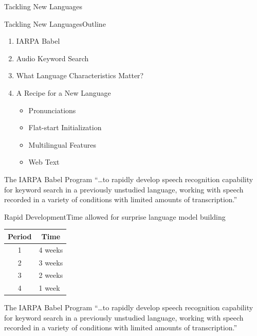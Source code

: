 \begin{frame}
  \begin{center}
    {\color{Maroon}\Huge Tackling New Languages}
  \end{center}
\end{frame}

\begin{frame}{Tackling New Languages}{Outline}
  \begin{enumerate}
  \item IARPA Babel
  \item Audio Keyword Search
  \item What Language Characteristics Matter?
  \item A Recipe for a New Language
    \begin{itemize}
    \item Pronunciations
    \item Flat-start Initialization
    \item Multilingual Features
    \item Web Text
    \end{itemize}
  \end{enumerate}
\end{frame}

\begin{frame}{The IARPA Babel Program}{}
  \Large{``\ldots to \alert{rapidly develop} speech recognition
    capability for keyword search in a previously unstudied
    language, working with speech recorded in a variety of
    conditions with limited amounts of transcription.''}\par
\end{frame}

\begin{frame}{Rapid Development}{Time allowed for surprise language model building}
  \centering
  \begin{tabular}{@{}cl@{}} \toprule
    {\bf Period} & \multicolumn{1}{c}{\bf Time} \\ \midrule
    1 & 4 weeks \\
    2 & 3 weeks \\
    3 & 2 weeks \\
    4 & 1 week  \\ \bottomrule
  \end{tabular}
\end{frame}

\begin{frame}{The IARPA Babel Program}{}
  \Large{``\ldots to rapidly develop speech recognition
    capability for keyword search in a \alert{previously unstudied
      language}, working with speech recorded in a variety of
    conditions with limited amounts of transcription.''}\par
\end{frame}

